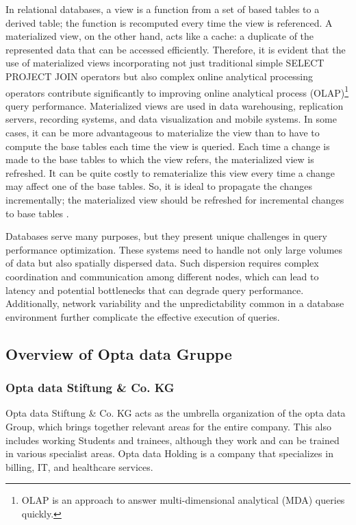 In relational databases, a view is a function from a set of based tables to a derived table; the function is recomputed every time the view is referenced. A materialized view, on the other hand, acts like a cache: a duplicate of the represented data that can be accessed efficiently. Therefore, it is evident that the use of materialized views incorporating not just traditional simple SELECT PROJECT JOIN operators but also complex online analytical processing operators contribute significantly to improving online analytical process (OLAP)\footnote{OLAP is an approach to answer multi-dimensional analytical (MDA) queries quickly.} query performance. Materialized views are used in data warehousing, replication servers, recording systems, and data visualization and mobile systems. In some cases, it can be more advantageous to materialize the view than to have to compute the base tables each time the view is queried. Each time a change is made to the base tables to which the view refers, the materialized view is refreshed. It can be quite costly to rematerialize this view every time a change may affect one of the base tables. So, it is ideal to propagate the changes incrementally; the materialized view should be refreshed for incremental changes to base tables \cite{Data_warehousing,efficient_incremental,rashid2009role}.\vspace{.4cm}

Databases serve many purposes, but they present unique challenges in query performance optimization. These systems need to handle not only large volumes of data but also spatially dispersed data. Such dispersion requires complex coordination and communication among different nodes, which can lead to latency and potential bottlenecks that can degrade query performance. Additionally, network variability and the unpredictability common in a database environment further complicate the effective execution of queries.

\subsection{Overview of Opta data Gruppe}
\subsubsection{Opta data Stiftung \& Co. KG }
Opta data Stiftung \& Co. KG acts as the umbrella organization of the opta data Group, which brings together relevant areas for the entire company. This also includes working Students and trainees, although they work and can be trained in various specialist areas. Opta data Holding is a company that specializes in billing, IT, and healthcare services.

